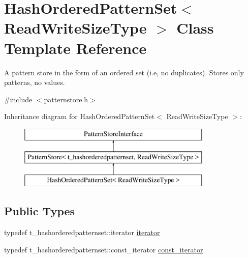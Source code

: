 \hypertarget{classHashOrderedPatternSet}{}\section{Hash\+Ordered\+Pattern\+Set$<$ Read\+Write\+Size\+Type $>$ Class Template Reference}
\label{classHashOrderedPatternSet}


A pattern store in the form of an ordered set (i.\+e, no duplicates). Stores only patterns, no values.  




{\ttfamily \#include $<$patternstore.\+h$>$}

Inheritance diagram for Hash\+Ordered\+Pattern\+Set$<$ Read\+Write\+Size\+Type $>$\+:\begin{figure}[H]
\begin{center}
\leavevmode
\includegraphics[height=3.000000cm]{classHashOrderedPatternSet}
\end{center}
\end{figure}
\subsection*{Public Types}
\begin{DoxyCompactItemize}
\item 
typedef t\+\_\+hashorderedpatternset\+::iterator \hyperlink{classHashOrderedPatternSet_a3191eb8aa122dfe2bf819d37468bd0b6}{iterator}
\item 
typedef t\+\_\+hashorderedpatternset\+::const\+\_\+iterator \hyperlink{classHashOrderedPatternSet_a5e1bbb1c4ef5ee0937bc0d5251a8d97e}{const\+\_\+iterator}
\end{DoxyCompactItemize}
